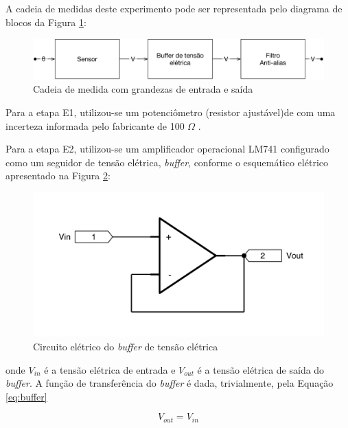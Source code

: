 \documentclass[a4paper]{instrumentacao}
\begin{document}
A cadeia de medidas deste experimento pode ser representada pelo diagrama de blocos da Figura \ref{fig:pendulo-cadeia-medidas}:

\begin{figure}[H]
\centering
\includegraphics[width=\textwidth]{Cadeia de medida.pdf}
\caption{Cadeia de medida com grandezas de entrada e saída}
\label{fig:pendulo-cadeia-medidas}
\end{figure}

Para a etapa E1, utilizou-se um potenciômetro (resistor ajustável)de  com uma incerteza informada pelo fabricante de 100 $\Omega$ .

Para a etapa E2, utilizou-se um amplificador operacional LM741\cite{datasheet-lm741} configurado como um seguidor de tensão elétrica, \textit{buffer}, conforme o esquemático elétrico apresentado na Figura \ref{fig:buffer-tensão}:

\begin{figure}[H]
\centering
\includegraphics[width=\textwidth]{Buffer-tensao.pdf}
\caption{Circuito elétrico do \textit{buffer} de tensão elétrica}
\label{fig:buffer-tensão}
\end{figure}

\noindent
onde $V_{in}$ é a tensão elétrica de entrada e $V_{out}$ é a tensão elétrica de saída do \textit{buffer}. A função de transferência do \textit{buffer} é dada, trivialmente, pela Equação \ref{eq:buffer}

\begin{equation}
	V_{out} = V_{in}
	\label{eq:buffer}
\end{equation}
\end{document}
